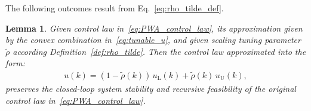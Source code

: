 \documentclass[preprint,12pt]{elsarticle}
\newtheorem{lemma}{Lemma}[theorem]
\newtheorem{corollary}{Corollary}[theorem]
\begin{document}
	The following outcomes result from Eq.~\eqref{eq:rho_tilde_def}. 
	\begin{lemma}
		\label{lem:PWA_control_law_interval}
		Given control law in~\eqref{eq:PWA_control_law}, its approximation given by the convex combination in~\eqref{eq:tunable_u}, and given scaling tuning parameter $\widetilde{\rho}$ according Definition~\ref{def:rho_tilde}. Then the control law  approximated into the form:
		\begin{eqnarray}
			\label{eq:PWA_control_law_interval}
			u(k) = (1-\widetilde{\rho}(k)) \, u_\mathrm{L}(k) + \widetilde{\rho}(k) \, u_\mathrm{U}(k),
		\end{eqnarray}
		preserves the closed-loop system stability and recursive feasibility of the original control law in~\eqref{eq:PWA_control_law}.
	\end{lemma}
\end{document}
